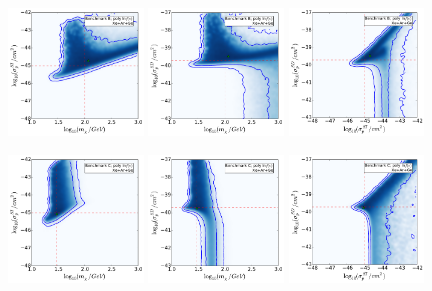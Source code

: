 \begin{figure}[p!]
  \includegraphics[trim=0.2cm 0.2cm 0.2cm 0.2cm, clip,width=0.32\textwidth]{NT/BenchmarkB_poly_noIC-mx_sigsi.pdf}
  \includegraphics[trim=0.2cm 0.2cm 0.2cm 0.2cm, clip,width=0.32\textwidth]{NT/BenchmarkB_poly_noIC-mx_sigsd.pdf}
  \includegraphics[trim=0.2cm 0.2cm 0.2cm 0.2cm, clip,width=0.32\textwidth]{NT/BenchmarkB_poly_noIC-sigsi_sigsd.pdf}

  \includegraphics[trim=0.2cm 0.2cm 0.2cm 0.2cm, clip,width=0.32\textwidth]{NT/BenchmarkC_poly_noIC-mx_sigsi.pdf}
  \includegraphics[trim=0.2cm 0.2cm 0.2cm 0.2cm, clip,width=0.32\textwidth]{NT/BenchmarkC_poly_noIC-mx_sigsd.pdf}
  \includegraphics[trim=0.2cm 0.2cm 0.2cm 0.2cm, clip,width=0.32\textwidth]{NT/BenchmarkC_poly_noIC-sigsi_sigsd.pdf}


\end{figure}
